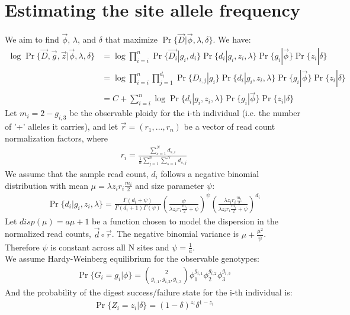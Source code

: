 \documentclass{article}
\begin{document}
\section{Estimating the site allele frequency}
We aim to find $\vec{\phi}$, $\lambda$, and $\delta$ that maximize $\Pr\{\vec{D} | \vec{\phi}, \lambda, \delta\}$. We have:
\begin{align*}
\log\Pr\{\vec{D}, \vec{g}, \vec{z} | \vec{\phi}, \lambda, \delta \} &= \log\prod_{i=i}^{n}\Pr\{\vec{D_i} | g_i, d_i\}\Pr\{d_i | g_i, z_i, \lambda\}\Pr\{g_i | \vec{\phi}\}\Pr\{z_i | \delta\} \\
&= \log\prod_{i=i}^{n}\prod_{j=1}^{d_i}\Pr\{D_{i,j} | g_i\}\Pr\{d_i | g_i, z_i, \lambda\}\Pr\{g_i | \vec{\phi}\}\Pr\{z_i | \delta\} \\
&= C + \sum_{i=i}^{n}\log\Pr\{d_i | g_i, z_i, \lambda\}\Pr\{g_i | \vec{\phi}\}\Pr\{z_i | \delta\}
\end{align*}
Let $m_i = 2 - g_{i,3}$ be the observable ploidy for the i-th individual (i.e. the number of '+' alleles it carries), and let $\vec{r} = (r_1, ..., r_n)$ be a vector of read count normalization factors, where
\begin{align*}
r_i = \frac{\sum_{s=1}^{N} d_{s,i}}{\frac{1}{n}\sum_{j=1}^{n} \sum_{s=1}^{N} d_{s,j}}
\end{align*}
We assume that the sample read count, $d_i$ follows a negative binomial distribution with mean $\mu = \lambda z_i r_i \frac{m_i}{2}$ and size parameter $\psi$:
\begin{align*}
\Pr\{d_i | g_i, z_i, \lambda\} = \frac{\Gamma(d_i + \psi)}{\Gamma(d_i + 1)\Gamma(\psi)}\left(\frac{\psi}{\lambda z_i r_i \frac{m_i}{2} + \psi}\right)^\psi\left(\frac{\lambda z_i r_i \frac{m_i}{2}}{\lambda z_i r_i \frac{m_i}{2} + \psi}\right)^{d_i}
\end{align*}
Let $disp(\mu) = a\mu + 1$ be a function chosen to model the dispersion in the normalized read counts, $\vec{d} \circ \vec{r}$. The negative binomial variance is $\mu + \frac{\mu^2}{\psi}$. Therefore $\psi$ is constant across all N sites and $\psi = \frac{1}{a}$. \\
We assume Hardy-Weinberg equilibrium for the observable genotypes:
\begin{align*}
\Pr\{G_i = g_i | \phi\} = \binom{2}{g_{i,1}, g_{i,2}, g_{i,3}}\phi_1^{g_{i,1}}\phi_2^{g_{i,2}}\phi_3^{g_{i,3}}
\end{align*}
And the probability of the digest success/failure state for the i-th individual is:
\begin{align*}
\Pr\{Z_i = z_i | \delta\} = (1 - \delta)^{z_i} \delta^{1 - z_i}
\end{align*}
\end{document}
